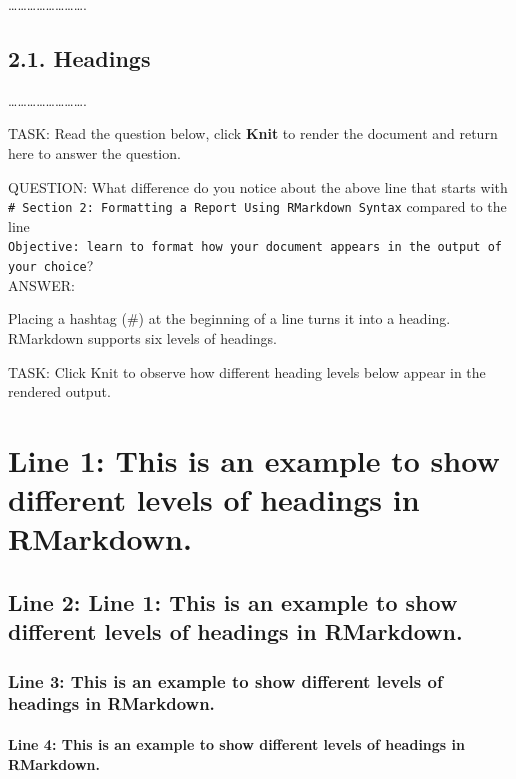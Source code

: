 \documentclass[
]{article}
\begin{document}
\ldots\ldots\ldots\ldots\ldots\ldots\ldots\ldots.

\subsection{2.1. Headings}\label{headings}

\ldots\ldots\ldots\ldots\ldots\ldots\ldots\ldots.

TASK: Read the question below, click \textbf{Knit} to render the
document and return here to answer the question.

QUESTION: What difference do you notice about the above line that starts
with
\texttt{\#\ Section\ 2:\ Formatting\ a\ Report\ Using\ RMarkdown\ Syntax}
compared to the line
\texttt{Objective:\ learn\ to\ format\ how\ your\ document\ appears\ in\ the\ output\ of\ your\ choice}?\\
ANSWER:

\hfill\break

Placing a hashtag (\#) at the beginning of a line turns it into a
heading. RMarkdown supports six levels of headings.

\hfill\break

TASK: Click Knit to observe how different heading levels below appear in
the rendered output.

\section{Line 1: This is an example to show different levels of headings
in
RMarkdown.}\label{line-1-this-is-an-example-to-show-different-levels-of-headings-in-rmarkdown.}

\subsection{Line 2: Line 1: This is an example to show different levels
of headings in
RMarkdown.}\label{line-2-line-1-this-is-an-example-to-show-different-levels-of-headings-in-rmarkdown.}

\subsubsection{Line 3: This is an example to show different levels of
headings in
RMarkdown.}\label{line-3-this-is-an-example-to-show-different-levels-of-headings-in-rmarkdown.}

\paragraph{Line 4: This is an example to show different levels of
headings in
RMarkdown.}\label{line-4-this-is-an-example-to-show-different-levels-of-headings-in-rmarkdown.}
\end{document}
